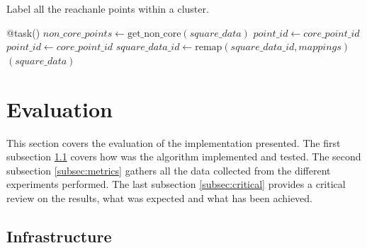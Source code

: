 \documentclass[10pt,journal,compsoc]{IEEEtran}
\let\MYoriglatexcaption\caption
\renewcommand{\caption}[2][\relax]{\MYoriglatexcaption[#2]{#2}}
\begin{document}
\begin{algorithm}
  \caption{Label all the reachanle points within a cluster. \label{alg:expand-clusters}}
  \begin{algorithmic}[1]
    \State @task()
        \State {}
        \State $non\_core\_points \gets \text{get\_non\_core}(square\_data)$
                \State $point\_id \gets core\_point\_id$
                \State $point\_id \gets core\_point\_id$
            \EndIf
        \EndFor
        \State {}
        \State $square\_data\_id \gets \text{remap}(square\_data\_id, mappings)$
        \State {}$(square\_data)$
    \EndFunction
  \end{algorithmic}
\end{algorithm}


\section{Evaluation} \label{sec:performance}


This section covers the evaluation of the implementation presented. The first subsection \ref{subsec:infrastructure} covers how was the algorithm implemented and tested. The second subsection \ref{subsec:metrics} gathers all the data collected from the different experiments performed. The last subsection \ref{subsec:critical} provides a critical review on the results, what was expected and what has been achieved.

\subsection{Infrastructure} \label{subsec:infrastructure}
\end{document}
